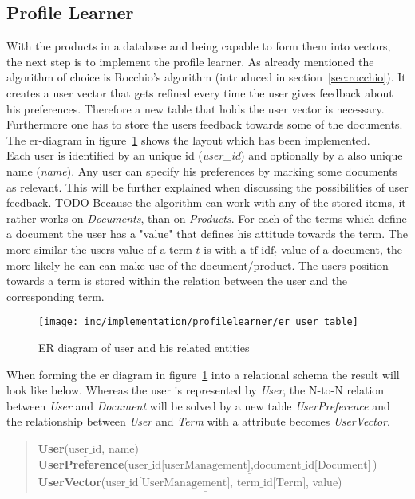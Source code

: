 
\subsection{Profile Learner}
With the products in a database and being capable to form them into vectors, the next step is to implement the profile learner.
As already mentioned the algorithm of choice is Rocchio's algorithm (intruduced in section~\ref{sec:rocchio}).
It creates a user vector that gets refined every time the user gives feedback about his preferences.
Therefore a new table that holds the user vector is necessary.
Furthermore one has to store the users feedback towards some of the documents.
The er-diagram in figure~\ref{fig:er_user_table} shows the layout which has been implemented.\\
Each user is identified by an unique id (\textit{user\_id}) and optionally by a also unique name (\textit{name}).
Any user can specify his preferences by marking some documents as relevant.
This will be further explained when discussing the possibilities of user feedback.
{\color{red}TODO}
Because the algorithm can work with any of the stored items, it rather works on \textit{Documents}, than on \textit{Products}.
For each of the terms which define a document the user has a "value" that defines his attitude towards the term.
The more similar the users value of a term $t$ is with a $\text{tf-idf}_t$ value of a document, the more likely he can can make use of the document/product.
The users position towards a term is stored within the relation between the user and the corresponding term.

\begin{figure}[h]
    \center
    \texttt{[image: inc/implementation/profilelearner/er\_user\_table]}
    \caption{ER diagram of user and his related entities}
    \label{fig:er_user_table}
\end{figure}

\noindent
When forming the er diagram in figure~\ref{fig:er_user_table} into a relational schema the result will look like below.
Whereas the user is represented by \textit{User}, the N-to-N relation between \textit{User} and \textit{Document} will be solved by a new table \textit{UserPreference} and the relationship between \textit{User} and \textit{Term} with a attribute becomes \textit{UserVector}.
\begin{quote}
    \textbf{User}($\underline{\text{user\_id}}$, name)\\
    \textbf{UserPreference}($\underline{\text{user\_id[userManagement]},\text{document\_id[Document]}}$)\\
    \textbf{UserVector}($\underline{\text{user\_id[UserManagement], term\_id[Term]}}$, value)\\
\end{quote}

